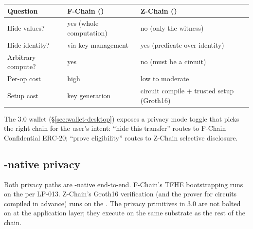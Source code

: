 \begin{longtable}{p{}p{}p{}}
\toprule
\textbf{Question} & \textbf{F-Chain (\FHE{})} & \textbf{Z-Chain (\ZKP{})} \\
\midrule
Hide values? & yes (whole computation) & no (only the witness) \\
Hide identity? & via key management & yes (predicate over identity) \\
Arbitrary compute? & yes & no (must be a circuit) \\
Per-op cost & high & low to moderate \\
Setup cost & key generation & circuit compile + trusted setup (Groth16) \\
\bottomrule
\end{longtable}

The \Zoo{} 3.0 wallet (\S\ref{sec:wallet-desktop}) exposes a privacy
mode toggle that picks the right chain for the user's intent: ``hide
this transfer'' routes to F-Chain Confidential ERC-20; ``prove
eligibility'' routes to Z-Chain selective disclosure.

\subsection{\GPU{}-native privacy}

Both privacy paths are \GPU{}-native end-to-end. F-Chain's TFHE
bootstrapping runs on the \GPU{} per LP-013. Z-Chain's Groth16
verification (and the prover for circuits compiled in advance) runs
on the \GPU{}. The privacy primitives in \Zoo{} 3.0 are not bolted on
at the application layer; they execute on the same substrate as the
rest of the chain.
